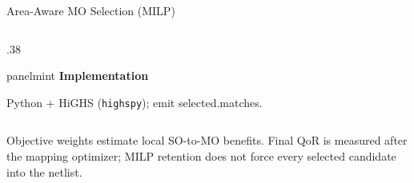 \documentclass[aspectratio=169,10pt]{beamer}
\newcommand{\smallpanel}[3]{%
  \begin{beamercolorbox}[rounded=true,sep=0.13cm,wd=\linewidth]{#1}%
    {\small\bfseries\color{Accent}#2}\par\vspace{0.06cm}
    {\scriptsize\color{Ink}#3}%
  \end{beamercolorbox}%
}
\begin{document}
\begin{frame}[shrink=15]{Area-Aware MO Selection (MILP)}
\begin{columns}[T,onlytextwidth]
\begin{column}{.38\textwidth}
\begin{center}
      \end{center}
      \vspace{.06cm}
      \smallpanel{panelmint}{Implementation}{Python + HiGHS (\texttt{highspy}); emit selected.matches.}
    \end{column}
  \end{columns}
  \vspace{.08cm}
  {\scriptsize\color{Muted}Objective weights estimate local SO-to-MO benefits. Final QoR is measured after the mapping optimizer; MILP retention does not force every selected candidate into the netlist.}
\end{frame}


\end{document}
